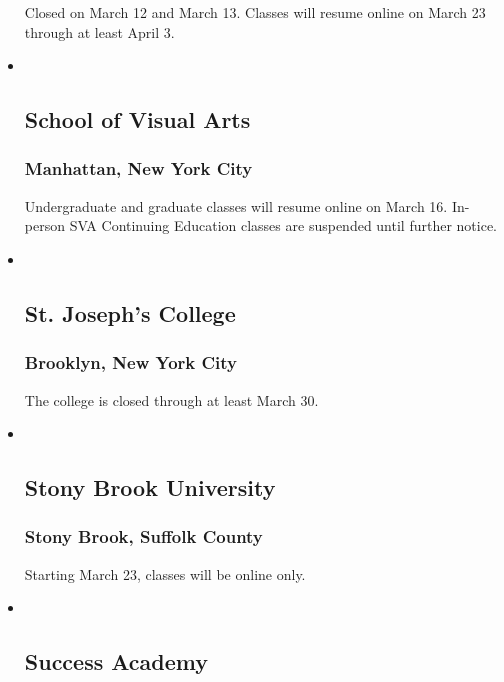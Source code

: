 \begin{itemize}
  Closed on March 12 and March 13. Classes will resume online on March
  23 through at least April 3.
\item ~
  \hypertarget{school-of-visual-arts}{%
  \subsection{School of Visual Arts}\label{school-of-visual-arts}}

  \hypertarget{manhattan-new-york-city-9}{%
  \subsubsection{Manhattan, New York
  City}\label{manhattan-new-york-city-9}}

  Undergraduate and graduate classes will resume online on March 16.
  In-person SVA Continuing Education classes are suspended until further
  notice.
\item ~
  \hypertarget{st-josephs-college}{%
  \subsection{St. Joseph's College}\label{st-josephs-college}}

  \hypertarget{brooklyn-new-york-city-3}{%
  \subsubsection{Brooklyn, New York
  City}\label{brooklyn-new-york-city-3}}

  The college is closed through at least March 30.
\item ~
  \hypertarget{stony-brook-university}{%
  \subsection{Stony Brook University}\label{stony-brook-university}}

  \hypertarget{stony-brook-suffolk-county}{%
  \subsubsection{Stony Brook, Suffolk
  County}\label{stony-brook-suffolk-county}}

  Starting March 23, classes will be online only.
\item ~
  \hypertarget{success-academy}{%
  \subsection{Success Academy}\label{success-academy}}


\end{itemize}
